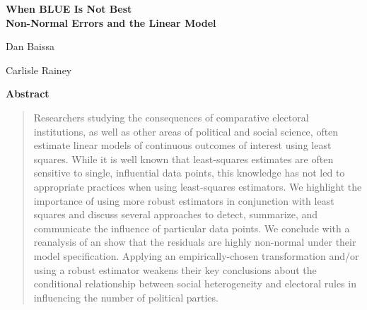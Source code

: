 \documentclass[12pt]{article}
\begin{document}
\begin{center}
{\LARGE \textbf{When BLUE Is Not Best}}\\\vspace{2mm}
{ \textbf{Non-Normal Errors and the Linear Model}}\\\vspace{2mm}


\vspace{10mm}

Dan Baissa

\vspace{3mm}

Carlisle Rainey
\end{center}

\vspace{10mm}

{\centerline{\textbf{Abstract}}}
\begin{quote}\noindent
Researchers studying the consequences of comparative electoral institutions, as well as other areas of political and social science, often estimate linear models of continuous outcomes of interest using least squares. 
While it is well known that least-squares estimates are often sensitive to single, influential data points, this knowledge has not led to appropriate practices when using least-squares estimators. 
We highlight the importance of using more robust estimators in conjunction with least squares and discuss several approaches to detect, summarize, and communicate the influence of particular data points. 
We conclude with a reanalysis of \cite{ClarkGolder2006} an show that the residuals are highly non-normal under their model specification. 
Applying an empirically-chosen transformation and/or using a robust estimator weakens their key conclusions about the conditional relationship between social heterogeneity and electoral rules in influencing the number of political parties.
 \end{quote}
\end{document}
